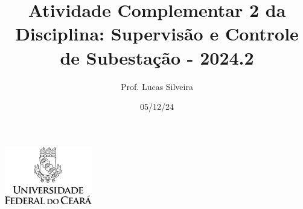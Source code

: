 \documentclass[12pt]{article}
\title{Atividade Complementar 2 da Disciplina: Supervisão e Controle de Subestação - 2024.2}
\author{Prof. Lucas Silveira}
\date{05/12/24}
\begin{document}
{
  \centering
  \vspace{-0.4in}
  \includegraphics[width=1.5in]{brasao-ufc-mono.png}
  \vspace{-0.2in}
  {\let\newpage\relax\maketitle}
}


\end{document}
